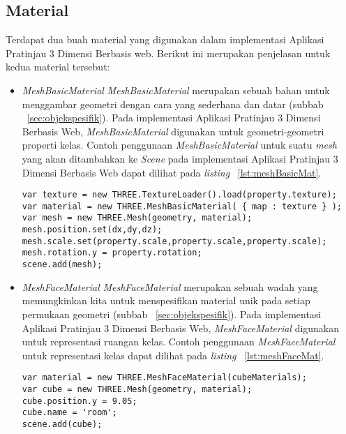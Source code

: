 \subsection{Material}
Terdapat dua buah material yang digunakan dalam implementasi Aplikasi Pratinjau 3 Dimensi Berbasis web. Berikut ini merupakan penjelasan untuk kedua material tersebut:
\begin{itemize}
	\item {\it MeshBasicMaterial}
{\it MeshBasicMaterial} merupakan sebuah bahan untuk menggambar geometri dengan cara yang sederhana dan datar (subbab ~\ref{sec:objekspesifik}). Pada implementasi Aplikasi Pratinjau 3 Dimensi Berbasis Web, {\it MeshBasicMaterial} digunakan untuk geometri-geometri properti kelas. Contoh penggunaan {\it MeshBasicMaterial} untuk suatu {\it mesh} yang akan ditambahkan ke {\it Scene} pada implementasi Aplikasi Pratinjau 3 Dimensi Berbasis Web dapat dilihat pada {\it listing} ~\ref{lst:meshBasicMat}.
\begin{lstlisting}[caption={Contoh penggunaan {\it MeshBasicMaterial}}, label={lst:meshBasicMat},captionpos=b]
var texture = new THREE.TextureLoader().load(property.texture);
var material = new THREE.MeshBasicMaterial( { map : texture } ); 
var mesh = new THREE.Mesh(geometry, material);
mesh.position.set(dx,dy,dz);
mesh.scale.set(property.scale,property.scale,property.scale);
mesh.rotation.y = property.rotation;
scene.add(mesh);
\end{lstlisting}

	\item {\it MeshFaceMaterial}
{\it MeshFaceMaterial} merupakan sebuah wadah yang memungkinkan kita untuk menspesifikan material unik pada setiap permukaan geometri (subbab ~\ref{sec:objekspesifik}). Pada implementasi Aplikasi Pratinjau 3 Dimensi Berbasis Web, {\it MeshFaceMaterial} digunakan untuk representasi ruangan kelas. Contoh penggunaan {\it MeshFaceMaterial} untuk representasi kelas dapat dilihat pada {\it listing} ~\ref{lst:meshFaceMat}.
\begin{lstlisting}[caption={Contoh penggunaan {\it MeshFaceMaterial}}, label={lst:meshFaceMat},captionpos=b]
var material = new THREE.MeshFaceMaterial(cubeMaterials);
var cube = new THREE.Mesh(geometry, material);
cube.position.y = 9.05;
cube.name = 'room';
scene.add(cube);
\end{lstlisting}
\end{itemize}

